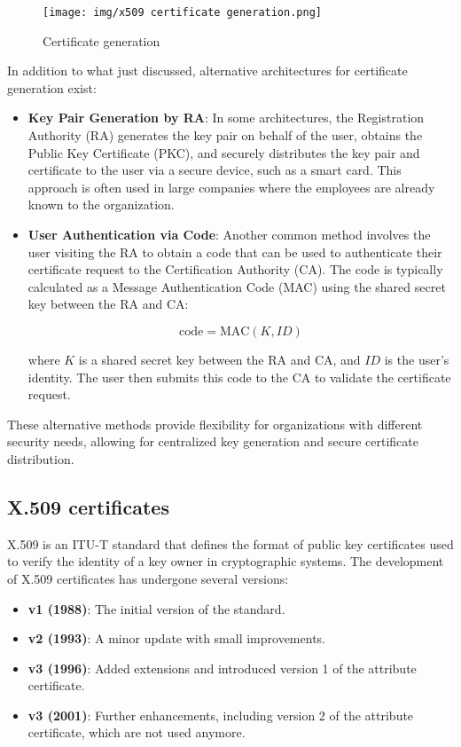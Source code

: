 \begin{figure}[h]
  \centering
  \texttt{[image: img/x509 certificate
  generation.png]}
  \caption{Certificate generation}
\end{figure}


In addition to what just discussed, alternative architectures for
certificate generation exist:

\begin{itemize}
  \item \textbf{Key Pair Generation by RA}: In some architectures, the
    Registration Authority (RA) generates the key pair on behalf of
    the user, obtains the Public Key Certificate (PKC), and securely
    distributes the key pair and certificate to the user via a
    secure device, such as a smart card. This approach is often used
    in large companies where the employees are already known to the
    organization.

  \item \textbf{User Authentication via Code}: Another common method
    involves the user visiting the RA to obtain a code that can be
    used to authenticate their certificate request to the
    Certification Authority (CA). The code is typically calculated
    as a Message Authentication Code (MAC) using the shared secret
    key between the RA and CA:

    \[
      \text{code} = \text{MAC}(K, ID)
    \]

    where \(K\) is a shared secret key between the RA and CA, and
    \(ID\) is the user's identity. The user then submits this code to
    the CA to validate the certificate request.
\end{itemize}

These alternative methods provide flexibility for organizations with
different security needs, allowing for centralized key generation and
secure certificate distribution.

\subsection{X.509 certificates}

X.509 is an ITU-T standard that defines the format of public key
certificates used to verify the identity of a key owner in
cryptographic systems. The development of X.509 certificates has
undergone several versions:

\begin{itemize}
  \item \textbf{v1 (1988)}: The initial version of the standard.
  \item \textbf{v2 (1993)}: A minor update with small improvements.
  \item \textbf{v3 (1996)}: Added extensions and introduced version
    1 of the attribute certificate.
  \item \textbf{v3 (2001)}: Further enhancements, including version
    2 of the attribute certificate, which are not used anymore.
\end{itemize}

